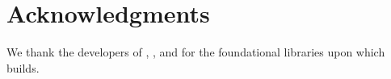 \documentclass[article]{jss}
\begin{document}

\section*{Acknowledgments}

We thank the developers of , , and  for the foundational libraries upon which  builds.



\end{document}
